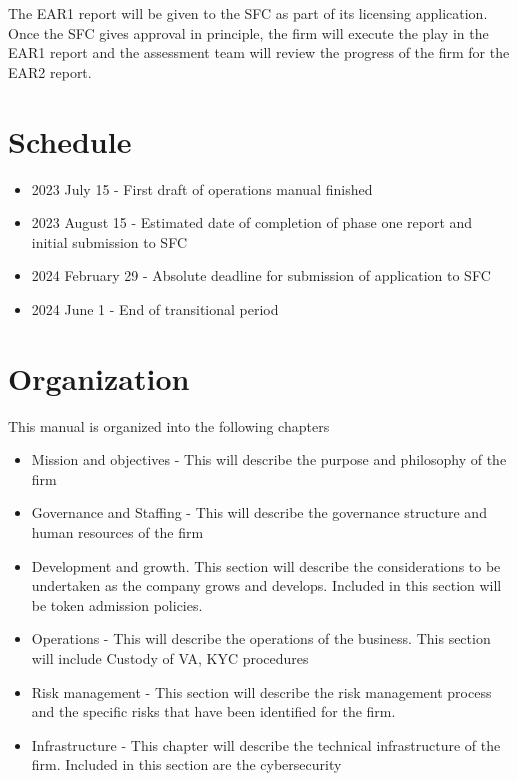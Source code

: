 The EAR1 report will be given to the SFC as part of its licensing
application.  Once the SFC gives approval in principle, the firm will
execute the play in the EAR1 report and the assessment team will
review the progress of the firm for the EAR2 report.

\section{Schedule}
\begin{itemize}
\item 2023 July 15 - First draft of operations manual finished
  \item 2023 August 15 - Estimated date of completion of phase one
    report and initial submission to SFC
    \item 2024 February 29 - Absolute deadline for submission of
      application to SFC
    \item 2024 June 1 - End of transitional period
\end{itemize}


\section{Organization}

This manual is organized into the following chapters

\begin{itemize}
\item Mission and objectives - This will describe the purpose and
  philosophy of the firm
  \item Governance and Staffing - This will describe the governance
    structure and human resources of the firm
  \item Development and growth.  This section will describe the
    considerations to be undertaken as the company grows and develops.
    Included in this section will be token admission policies.
  \item Operations - This will describe the operations of the
    business.  This section will include Custody of VA, KYC procedures
  \item Risk management - This section will describe the risk
    management process and the specific risks that have been
    identified for the firm.
  \item Infrastructure - This chapter will describe the technical
    infrastructure of the firm.  Included in this section are the
    cybersecurity
\end{itemize}

